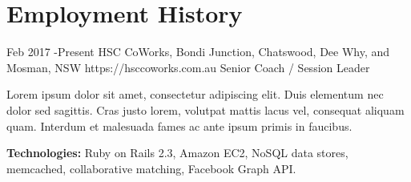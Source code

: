 \documentclass[10pt]{article} %
\begin{document}






\section{Employment History}

\job
{Feb 2017 -}{Present}
{HSC CoWorks, Bondi Junction, Chatswood, Dee Why, and Mosman, NSW}
{https://hsccoworks.com.au}
{Senior Coach / Session Leader}
{Lorem ipsum dolor sit amet, consectetur adipiscing elit. Duis elementum nec dolor sed sagittis. Cras justo lorem, volutpat mattis lacus vel, consequat aliquam quam. Interdum et malesuada fames ac ante ipsum primis in faucibus.\\
\rule{0mm}{5mm}\textbf{Technologies:} Ruby on Rails 2.3, Amazon EC2, NoSQL data stores, memcached, collaborative matching, Facebook Graph API.}

\end{document}
